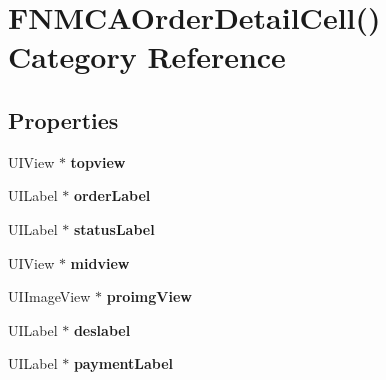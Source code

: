 \hypertarget{category_f_n_m_c_a_order_detail_cell_07_08}{}\section{F\+N\+M\+C\+A\+Order\+Detail\+Cell() Category Reference}
\label{category_f_n_m_c_a_order_detail_cell_07_08}
\subsection*{Properties}
\begin{DoxyCompactItemize}
\item 
\mbox{\label{category_f_n_m_c_a_order_detail_cell_07_08_a11ae62960e6a718bbd9ff9db8cd68b2d}} 
U\+I\+View $\ast$ {\bfseries topview}
\item 
\mbox{\label{category_f_n_m_c_a_order_detail_cell_07_08_a71ad10edba6de13c9f5200d69041b15c}} 
U\+I\+Label $\ast$ {\bfseries order\+Label}
\item 
\mbox{\label{category_f_n_m_c_a_order_detail_cell_07_08_ae23efff9e4768410de6debc207bb7ef3}} 
U\+I\+Label $\ast$ {\bfseries status\+Label}
\item 
\mbox{\label{category_f_n_m_c_a_order_detail_cell_07_08_ae67512afb09b321961044190f02ba17c}} 
U\+I\+View $\ast$ {\bfseries midview}
\item 
\mbox{\label{category_f_n_m_c_a_order_detail_cell_07_08_aee85dcb0c2571ed8edfbf2e0b87c4744}} 
U\+I\+Image\+View $\ast$ {\bfseries proimg\+View}
\item 
\mbox{\label{category_f_n_m_c_a_order_detail_cell_07_08_a37eaa6b33d3d75e5084a03d60f378a13}} 
U\+I\+Label $\ast$ {\bfseries deslabel}
\item 
\mbox{\label{category_f_n_m_c_a_order_detail_cell_07_08_afe297d27bb036d82a01e432c7211c742}} 
U\+I\+Label $\ast$ {\bfseries payment\+Label}
\item 

\end{DoxyCompactItemize}
